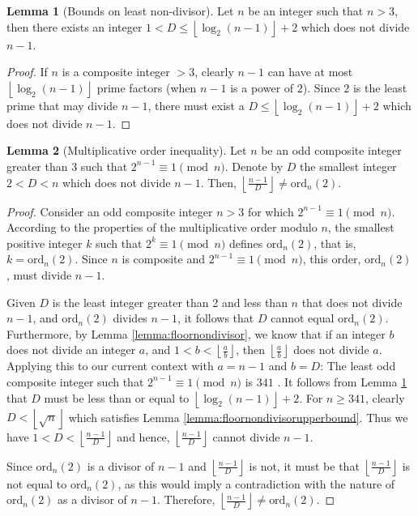 \documentclass{article}
\theoremstyle{plain}
\theoremstyle{definition}
\newtheorem{lemma}{Lemma}
\begin{document}
\begin{lemma}[Bounds on least non-divisor] \label{lemma:leastnondivisor}
Let $n$ be an integer such that $n > 3$, then there exists an integer $1 < D \leq \left\lfloor\log_2(n-1)\right\rfloor + 2$ which does not divide $n-1$.
\end{lemma}
\begin{proof}
If $n$ is a composite integer $> 3$, clearly $n-1$ can have at most $\left\lfloor\log_2(n-1)\right\rfloor$ prime factors (when $n-1$ is a power of $2$). Since $2$ is the least prime that may divide $n-1$, there must exist a $D \leq \left\lfloor\log_2(n-1)\right\rfloor + 2$ which does not divide $n-1$.
\end{proof}

\begin{lemma}[Multiplicative order inequality] \label{lemma:orderinequality}
Let \( n \) be an odd composite integer greater than 3 such that \( 2^{n-1} \equiv 1 \pmod{n} \). Denote by \( D \) the smallest integer \(2 < D < n \) which does not divide \( n-1 \). Then, \( \left\lfloor\frac{n-1}{D}\right\rfloor \not= \text{ord}_n(2) \).
\end{lemma}
\begin{proof}
Consider an odd composite integer \( n > 3 \) for which \( 2^{n-1} \equiv 1 \pmod{n} \). According to the properties of the multiplicative order modulo $n$, the smallest positive integer \( k \) such that \( 2^k \equiv 1 \pmod{n} \) defines \( \text{ord}_n(2) \), that is, \( k = \text{ord}_n(2) \). Since $n$ is composite and \( 2^{n-1} \equiv 1 \pmod{n} \), this order, \( \text{ord}_n(2) \), must divide \( n-1 \).

Given \( D \) is the least integer greater than 2 and less than \( n \) that does not divide \( n-1 \), and \( \text{ord}_n(2) \) divides \( n-1 \), it follows that \( D \) cannot equal \( \text{ord}_n(2) \). Furthermore, by Lemma \ref{lemma:floornondivisor}, we know that if an integer \( b \) does not divide an integer \( a \), and \( 1 < b < \left\lfloor \frac{a}{b} \right\rfloor \), then \( \left\lfloor \frac{a}{b} \right\rfloor \) does not divide \( a \). Applying this to our current context with \( a = n-1 \) and \( b = D \): The least odd composite integer such that \( 2^{n-1} \equiv 1 \pmod{n} \) is $341$ \cite{oeisfermatpspbase2}. It follows from Lemma \ref{lemma:leastnondivisor} that $D$ must be less than or equal to $\left\lfloor\log_2(n-1)\right\rfloor + 2$. For $n \geq 341$, clearly $D < \left\lfloor\sqrt{n}\right\rfloor$ which satisfies Lemma \ref{lemma:floornondivisorupperbound}. Thus we have \( 1 < D < \left\lfloor \frac{n-1}{D} \right\rfloor \) and hence, \( \left\lfloor \frac{n-1}{D} \right\rfloor \) cannot divide \( n-1 \).

Since \( \text{ord}_n(2) \) is a divisor of \( n-1 \) and \( \left\lfloor \frac{n-1}{D} \right\rfloor \) is not, it must be that \( \left\lfloor \frac{n-1}{D} \right\rfloor \) is not equal to \( \text{ord}_n(2) \), as this would imply a contradiction with the nature of \( \text{ord}_n(2) \) as a divisor of \( n-1 \). Therefore, \( \left\lfloor\frac{n-1}{D}\right\rfloor \not= \text{ord}_n(2) \).
\end{proof}
\end{document}
